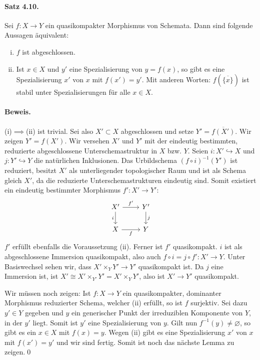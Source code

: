\paragraph{Satz 4.10.}\label{4.10} Sei $f:X\to Y$ ein quasikompakter Morphismus von Schemata. Dann sind folgende Aussagen äquivalent:
\begin{enumerate}[(i)]
\item $f$ ist abgeschlossen.
\item Ist $x\in X$ und $y'$ eine Spezialisierung von $y=f(x)$, so gibt es eine Spezialisierung $x'$ von $x$ mit $f(x')=y'$. Mit anderen Worten: $f(\overline{\{x\}})$ ist stabil unter Spezialisierungen für alle $x\in X$.
\end{enumerate}

\paragraph{Beweis.} (i)$\implies$(ii) ist trivial. Sei also $X'\subset X$ abgeschlossen und setze $Y'=\overline{f(X')}$. Wir zeigen $Y'=f(X')$. Wir versehen $X'$ und $Y'$ mit der eindeutig bestimmten, reduzierte abgeschlossene Unterschemastruktur in $X$ bzw. $Y$. Seien $i:X'\hookrightarrow X$ und $j:Y'\hookrightarrow Y$ die natürlichen Inklusionen. Das Urbildschema $(f\circ i)^{-1}(Y')$ ist reduziert, besitzt $X'$ als unterliegender topologischer Raum und ist als Schema gleich $X'$, da die reduzierte Unterschemastrukturen eindeutig sind. Somit existiert ein eindeutig bestimmter Morphismus $f':X'\to Y'$:
\[\begin{tikzcd}
X'\ar[r, "f'"]\ar[d, "i"'] & Y'\ar[d, "j"]\\
X\ar[r, "f"'] & Y
\end{tikzcd} \]
$f'$ erfüllt ebenfalls die Voraussetzung (ii). Ferner ist $f'$ quasikompakt. $i$ ist als abgeschlossene Immersion quasikompakt, also auch $f\circ i=j\circ f':X'\to Y$. Unter Basiswechsel sehen wir, dass $X'\times_YY'\to Y'$ quasikompakt ist. Da $j$ eine Immersion ist, ist $X'\cong X'\times_{Y'}Y' = X'\times_YY'$, also ist $X'\to Y'$ quasikompakt.

Wir müssen noch zeigen: Ist $f:X\to Y$ ein quasikompakter, dominanter Morphismus reduzierter Schema, welcher (ii) erfüllt, so ist $f$ surjektiv. Sei dazu $y'\in Y$ gegeben und $y$ ein generischer Punkt der irreduziblen Komponente von $Y$, in der $y'$ liegt. Somit ist $y'$ eine Spezialisierung von $y$. Gilt nun $f^{-1}(y)\neq\varnothing$, so gibt es ein $x\in X$ mit $f(x)=y$. Wegen (ii) gibt es eine Spezialisierung $x'$ von $x$ mit $f(x')=y'$ und wir sind fertig. Somit ist noch das nächste Lemma zu zeigen.\qed

